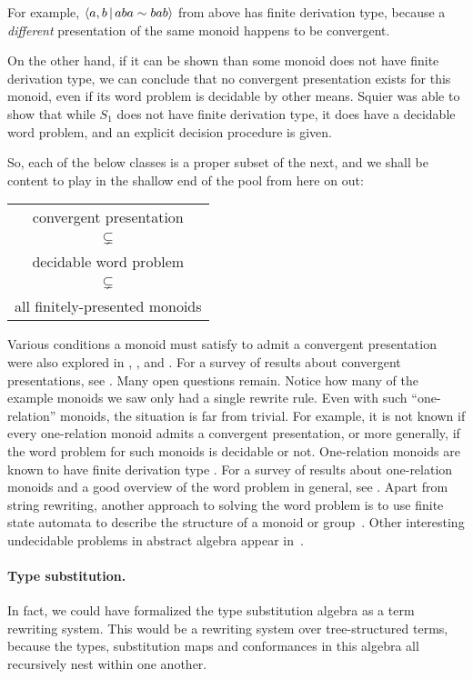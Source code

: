 \documentclass[../generics]{subfiles}
\begin{document}
For example, $\langle a,b\,|\,aba\sim bab\rangle$ from above has finite derivation type, because a \emph{different} presentation of the same monoid happens to be convergent.

On the other hand, if it can be shown than some monoid does not have finite derivation type, we can conclude that no convergent presentation exists for this monoid, even if its word problem is decidable by other means. Squier was able to show that while $S_1$ does not have finite derivation type, it does have a decidable word problem, and an explicit decision procedure is given.

So, each of the below classes is a proper subset of the next, and we shall be content to play in the shallow end of the pool from here on out:
\begin{center}
\begin{tabular}{c}
convergent presentation \\
$\subsetneq$ \\
decidable word problem \\
$\subsetneq$ \\
all finitely-presented monoids
\end{tabular}
\end{center}
Various conditions a monoid must satisfy to admit a convergent presentation were also explored in \cite{fptype}, \cite{fdtfp3}, and \cite{mild}. For a survey of results about convergent presentations, see \cite{Otto1997}. Many open questions remain. Notice how many of the example monoids we saw only had a single rewrite rule. Even with such ``one-relation'' monoids, the situation is far from trivial. For example, it is not known if every one-relation monoid admits a convergent presentation, or more generally, if the word problem for such monoids is decidable or not. One-relation monoids are known to have finite derivation type \cite{KOBAYASHI2000547}. For a survey of results about one-relation monoids and a good overview of the word problem in general, see \cite{onerelation}. Apart from string rewriting, another approach to solving the word problem is to use finite state automata to describe the structure of a monoid or group~\cite{epstein1992word}. Other interesting undecidable problems in abstract algebra appear in~\cite{tarski1953undecidable}.

\paragraph{Type substitution.} In fact, we could have formalized the type substitution algebra as a term rewriting system. This would be a rewriting system over tree-structured terms, because the types, substitution maps and conformances in this algebra all recursively nest within one another.
\end{document}
